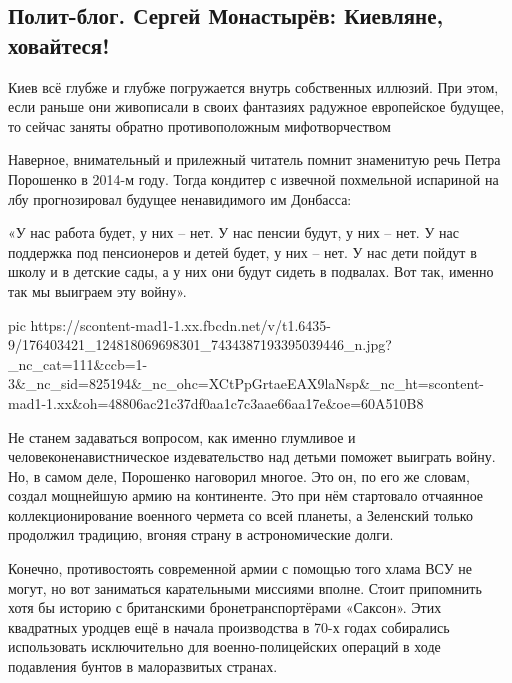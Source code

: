  
 
 
 
 
\subsection{Полит-блог. Сергей Монастырёв:  Киевляне, ховайтеся!}
\label{sec:21_04_2021.fb.respublikalnr.1.kiev}

Киев всё глубже и глубже погружается внутрь собственных иллюзий. При этом, если
раньше они живописали в своих фантазиях радужное европейское будущее, то сейчас
заняты обратно противоположным мифотворчеством

Наверное, внимательный и прилежный читатель помнит знаменитую речь Петра
Порошенко в 2014-м году. Тогда кондитер с извечной похмельной испариной на лбу
прогнозировал будущее ненавидимого им Донбасса:

«У нас работа будет, у них – нет. У нас пенсии будут, у них – нет. У нас
поддержка под пенсионеров и детей будет, у них – нет. У нас дети пойдут в школу
и в детские сады, а у них они будут сидеть в подвалах. Вот так, именно так мы
выиграем эту войну».

\ifcmt
  pic https://scontent-mad1-1.xx.fbcdn.net/v/t1.6435-9/176403421_124818069698301_7434387193395039446_n.jpg?_nc_cat=111&ccb=1-3&_nc_sid=825194&_nc_ohc=XCtPpGrtaeEAX9laNsp&_nc_ht=scontent-mad1-1.xx&oh=48806ac21c37df0aa1c7c3aae66aa17e&oe=60A510B8
\fi

Не станем задаваться вопросом, как именно глумливое и человеконенавистническое
издевательство над детьми поможет выиграть войну. Но, в самом деле, Порошенко
наговорил многое. Это он, по его же словам, создал мощнейшую армию на
континенте. Это при нём стартовало отчаянное коллекционирование военного
чермета со всей планеты, а Зеленский только продолжил традицию, вгоняя страну в
астрономические долги.

Конечно, противостоять современной армии с помощью того хлама ВСУ не могут, но
вот заниматься карательными миссиями вполне. Стоит припомнить хотя бы историю с
британскими бронетранспортёрами «Саксон». Этих квадратных уродцев ещё в начала
производства в 70-х годах собирались использовать исключительно для
военно-полицейских операций в ходе подавления бунтов в малоразвитых странах.


